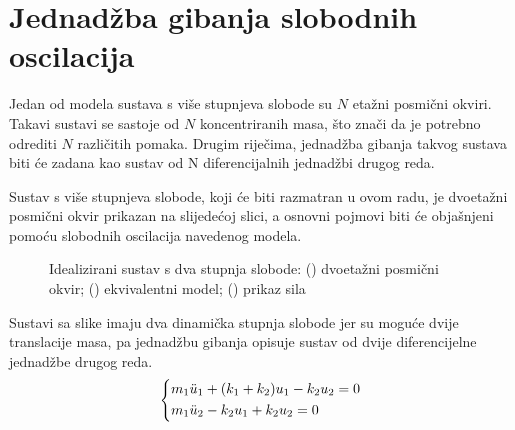 \section{Jednadžba gibanja slobodnih oscilacija}\label{slobodne_oscilacije}
Jedan od modela sustava s više stupnjeva slobode su $N$ etažni posmični
okviri. Takavi sustavi se sastoje od $N$ koncentriranih masa, što znači da je potrebno 
odrediti $N$ različitih pomaka. Drugim riječima, jednadžba gibanja takvog sustava biti će
zadana kao sustav od N diferencijalnih jednadžbi drugog reda.
\par

Sustav s više stupnjeva slobode, koji će biti razmatran u ovom radu, je dvoetažni
posmični okvir prikazan na slijedećoj slici, a osnovni pojmovi biti će objašnjeni
pomoću slobodnih oscilacija navedenog modela.
\begin{figure}[H]
    \begin{subfigure}[b]{0.5\textwidth}
        \centering
        
        \caption{}
        \label{fig:nepriguseni_sustav_okvir-2dof}
    \end{subfigure}
    \hfill
    \begin{subfigure}[b]{0.5\textwidth}
        \centering
        
        \caption{}
        \label{fig:nepriguseni_ekvivalentni_sustav-2dof}
    \end{subfigure}
    \vfill
    \vspace{0.5cm}
    \begin{subfigure}[b]{1\textwidth}
        \centering
        
        \caption{}
        \label{fig:sile_nepriguseni_ekvivalentni_sustav-2dof}
    \end{subfigure}
    \caption{Idealizirani sustav s dva stupnja slobode: 
        () dvoetažni posmični okvir;
        () ekvivalentni model;
        () prikaz sila}
    \label{fig:nepriguseni_sustav-2dof}
\end{figure}

Sustavi sa slike imaju dva dinamička stupnja slobode jer su moguće dvije translacije
masa, pa jednadžbu gibanja opisuje sustav od dvije diferencijelne
jednadžbe drugog reda.
\begin{equation}\label{eq:sustav_diferencijalnih}
    \begin{dcases}
        m_1\ddot{u}_1 + (k_1+k_2)u_1 -k_2u_2 = 0\\
        m_1\ddot{u}_2 - k_2u_1 + k_2 u_2 = 0
    \end{dcases}
\end{equation}

